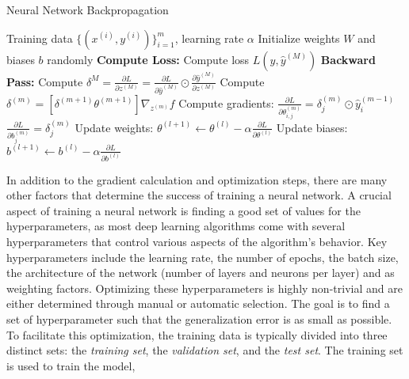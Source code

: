 \begin{algorithm}
    \caption{Neural Network Backpropagation \cite{rumelhart1986learning}}
    \label{alg:backprop}
    \begin{algorithmic}[1]
    \Require Training data $\{(x^{(i)}, y^{(i)})\}_{i=1}^{m}$, learning rate $\alpha$
    \State Initialize weights $W$ and biases $b$ randomly
    \Repeat
            \State \textbf{Compute Loss:}
            \State Compute loss $L(y, \hat{y}^{(M)})$
            \State \textbf{Backward Pass:}
            \State Compute $\delta^{M} = \frac{\partial L}{\partial z^{(M)}} = \frac{\partial L}{\partial \hat{y}^{(M)}} \odot \frac{\partial \hat{y}^{(M)}}{\partial z^{(M)}}$
                \State Compute $\delta^{(m)} = [\delta^{(m+1)} \theta^{(m+1)}] \nabla_{z^{(m)}} f$
                \State Compute gradients:
                \State $\frac{\partial L}{\partial \theta_{i,j}^{(m)}} = \delta^{(m)}_j \odot \hat{y}_i^{(m-1)}$
                \State $\frac{\partial L}{\partial b_j^{(m)}} = \delta_j^{(m)}$
            \EndFor
        \EndFor
            \State Update weights: $\theta^{(l+1)} \leftarrow \theta^{(l)} - \alpha \frac{\partial L}{\partial \theta^{(l)}}$
            \State Update biases: $b^{(l+1)} \leftarrow b^{(l)} - \alpha \frac{\partial L}{\partial b^{(l)}}$
        \EndFor
    \end{algorithmic}
    \end{algorithm}
In addition to the gradient calculation and optimization steps, there are many other factors that determine the success of training a neural network.
A crucial aspect of training a neural network is finding a good set of values for the hyperparameters,
as most deep learning algorithms come with several hyperparameters that control various aspects of the algorithm's behavior.
Key hyperparameters include the learning rate,
the number of epochs, the batch size, the architecture of the network (number of layers and neurons per layer) and as weighting factors.
Optimizing these hyperparameters is highly non-trivial and are either determined through manual or automatic selection.
The goal is to find a set of hyperparameter such that the generalization error is as small as possible.
To facilitate this optimization, the training data is typically divided into three distinct sets: the \emph{training set},
the \emph{validation set}, and the \emph{test set}. The training set is used to train the model,
